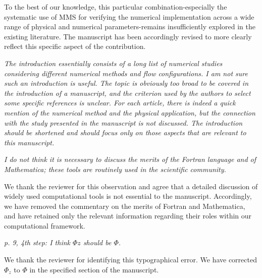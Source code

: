 \documentclass[12pt]{article}
\begin{document}
To the best of our knowledge, this particular combination-especially the systematic use of MMS for verifying the numerical implementation across a wide range of physical and numerical parameters-remains insufficiently explored in the existing literature. The manuscript has been accordingly revised to more clearly reflect this specific aspect of the contribution.
\vspace{3mm}

{\it The introduction essentially consists of a long list of numerical studies considering different numerical methods and flow configurations. I am not sure such an introduction is useful. The topic is obviously too broad to be covered in the introduction of a manuscript, and the criterion used by the authors to select some specific references is unclear. For each article, there is indeed a quick mention of the numerical method and the physical application, but the connection with the study presented in the manuscript is
not discussed. The introduction should be shortened and should focus only on those aspects that are relevant to this manuscript.}

\vspace{3mm}

\vspace{3mm}

{\it I do not think it is necessary to discuss the merits of the Fortran language and of Mathematica; these tools are routinely used in the scientific community.}

\vspace{3mm}
We thank the reviewer for this observation and agree that a detailed discussion of widely used computational tools is not essential to the manuscript. Accordingly, we have removed the commentary on the merits of Fortran and Mathematica, and have retained only the relevant information regarding their roles within our computational framework.
\vspace{3mm}

{\it p. 9, 4th step: I think $\Phi z$ should be $\Phi$.}

\vspace{3mm}
We thank the reviewer for identifying this typographical error. We have corrected $\Phi_z$ to $\Phi$ in the specified section of the manuscript.
\vspace{3mm}
\end{document}
